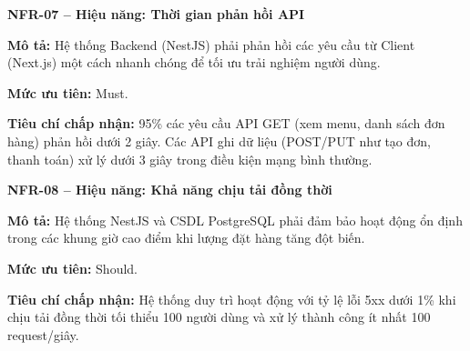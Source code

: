 \documentclass[a4paper]{article}
\begin{document}
\par\ifdim\dimexpr\pagegoal-\pagetotal\relax<6\baselineskip\newpage\fi
{}

\noindent\textbf{NFR-07 – Hiệu năng: Thời gian phản hồi API}\par\nopagebreak
\begin{list}{}{%
    \setlength{\leftmargin}{0.8cm}%
    \setlength{\rightmargin}{0pt}%
    \setlength{\labelwidth}{0pt}%
    \setlength{\labelsep}{0pt}%
    \setlength{\itemindent}{0pt}%
    \setlength{\listparindent}{0pt}%
    \setlength{\itemsep}{5pt}%
    \setlength{\parsep}{0pt}%
    \setlength{\topsep}{5pt}%
}
\item[] \textbf{Mô tả:} Hệ thống Backend (NestJS) phải phản hồi các yêu cầu từ Client (Next.js) một cách nhanh chóng để tối ưu trải nghiệm người dùng.
\item[] \textbf{Mức ưu tiên:} Must.
\item[] \textbf{Tiêu chí chấp nhận:} 95\% các yêu cầu API GET (xem menu, danh sách đơn hàng) phản hồi dưới 2 giây. Các API ghi dữ liệu (POST/PUT như tạo đơn, thanh toán) xử lý dưới 3 giây trong điều kiện mạng bình thường.
\end{list}

\par\ifdim\dimexpr\pagegoal-\pagetotal\relax<6\baselineskip\newpage\fi
{}

\noindent\textbf{NFR-08 – Hiệu năng: Khả năng chịu tải đồng thời}\par\nopagebreak
\begin{list}{}{%
    \setlength{\leftmargin}{0.8cm}%
    \setlength{\rightmargin}{0pt}%
    \setlength{\labelwidth}{0pt}%
    \setlength{\labelsep}{0pt}%
    \setlength{\itemindent}{0pt}%
    \setlength{\listparindent}{0pt}%
    \setlength{\itemsep}{5pt}%
    \setlength{\parsep}{0pt}%
    \setlength{\topsep}{5pt}%
}
\item[] \textbf{Mô tả:} Hệ thống NestJS và CSDL PostgreSQL phải đảm bảo hoạt động ổn định trong các khung giờ cao điểm khi lượng đặt hàng tăng đột biến.
\item[] \textbf{Mức ưu tiên:} Should.
\item[] \textbf{Tiêu chí chấp nhận:} Hệ thống duy trì hoạt động với tỷ lệ lỗi 5xx dưới 1\% khi chịu tải đồng thời tối thiểu 100 người dùng và xử lý thành công ít nhất 100 request/giây.
\end{list}

\par\ifdim\dimexpr\pagegoal-\pagetotal\relax<6\baselineskip\newpage\fi
{}
\end{document}
